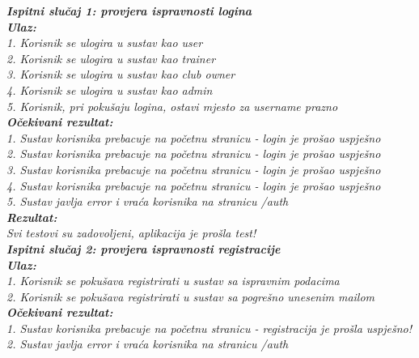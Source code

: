 			\textbf{\textit{Ispitni slučaj 1: provjera ispravnosti logina}}\\
			\textbf{\textit{Ulaz:}}\\
			
			 \textit{1. Korisnik se ulogira u sustav kao user}\\
			 \textit{2. Korisnik se ulogira u sustav kao trainer}\\
			 \textit{3. Korisnik se ulogira u sustav kao club owner}\\
			 \textit{4. Korisnik se ulogira u sustav kao admin}\\
			 \textit{5. Korisnik, pri pokušaju logina, ostavi mjesto za username prazno}\\

			 \textbf{\textit{Očekivani rezultat:}}\\

			 \textit{1. Sustav korisnika prebacuje na početnu stranicu - login je prošao uspješno}\\
			 \textit{2. Sustav korisnika prebacuje na početnu stranicu - login je prošao uspješno}\\
			 \textit{3. Sustav korisnika prebacuje na početnu stranicu - login je prošao uspješno}\\
			 \textit{4. Sustav korisnika prebacuje na početnu stranicu - login je prošao uspješno}\\
			 \textit{5. Sustav javlja error i vraća korisnika na stranicu /auth}\\

			 \textbf{\textit{Rezultat:}}\\
			 \textit{Svi testovi su zadovoljeni, aplikacija je prošla test!}\\

			 \textbf{\textit{Ispitni slučaj 2: provjera ispravnosti registracije}}\\
			 \textbf{\textit{Ulaz:}}\\
			 
			  \textit{1. Korisnik se pokušava registrirati u sustav sa ispravnim podacima}\\
			  \textit{2. Korisnik se pokušava registrirati u sustav sa pogrešno unesenim mailom}\\
 
			  \textbf{\textit{Očekivani rezultat:}}\\
 
			  \textit{1. Sustav korisnika prebacuje na početnu stranicu - registracija je prošla uspješno!}\\
			  \textit{2. Sustav javlja error i vraća korisnika na stranicu /auth}\\
 
